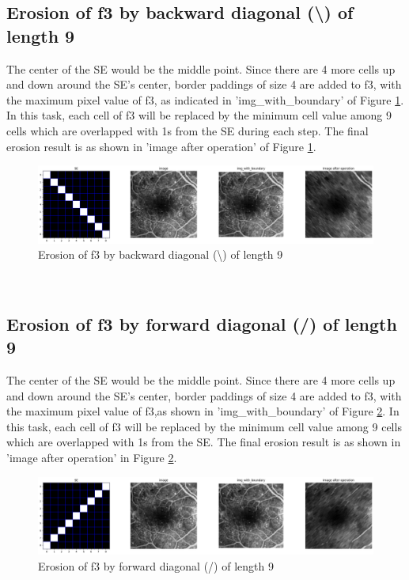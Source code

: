 \documentclass{article}
\begin{document}
\subsection{Erosion of f3 by backward diagonal (\textbackslash) of length 9}
The center of the SE would be the middle point. Since there are 4 more cells up and down around the SE's center, border paddings of size 4 are added to f3, with the maximum pixel value of f3, as indicated in 'img\_with\_boundary' of Figure \ref{fig:ef3_e4}. In this task, each cell of f3 will be replaced by the minimum cell value among 9 cells which are overlapped with 1s from the SE during each step. The final erosion result is as shown in 'image after operation' of Figure \ref{fig:ef3_e4}.\\
\begin{figure}[h!]
\includegraphics[width=\linewidth]{images/ef3_e4.png}
\caption{Erosion of f3 by backward diagonal (\textbackslash) of length 9}
\label{fig:ef3_e4}
\end{figure}
\\ 


\subsection{Erosion of f3 by forward diagonal (/) of length 9}
The center of the SE would be the middle point. Since there are 4 more cells up and down around the SE's center, border paddings of size 4 are added to f3, with the maximum pixel value of f3,as shown in 'img\_with\_boundary' of Figure \ref{fig:ef3_e5}. In this task, each cell of f3 will be replaced by the minimum cell value among 9 cells which are overlapped with 1s from the SE. The final erosion result is as shown in 'image after operation' in Figure \ref{fig:ef3_e5}.\\
\begin{figure}[h!]
\includegraphics[width=\linewidth]{images/ef3_e5.png}
\caption{Erosion of f3 by forward diagonal (/) of length 9}
\label{fig:ef3_e5}
\end{figure}
\\
\end{document}
